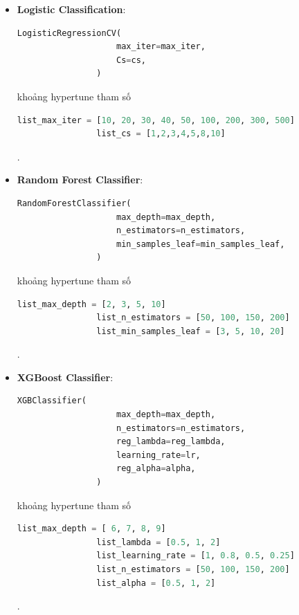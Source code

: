     \begin{itemize}
        \item \textbf{Logistic Classification}: 

            \begin{lstlisting}[language=Python]
                LogisticRegressionCV(
                    max_iter=max_iter,
                    Cs=cs,
                )
            \end{lstlisting}

            khoảng hypertune tham số

            \begin{lstlisting}[language=Python]
                list_max_iter = [10, 20, 30, 40, 50, 100, 200, 300, 500]
                list_cs = [1,2,3,4,5,8,10]
            \end{lstlisting}.

        \item \textbf{Random Forest Classifier}:

            \begin{lstlisting}[language=Python]
                RandomForestClassifier(
                    max_depth=max_depth,
                    n_estimators=n_estimators,
                    min_samples_leaf=min_samples_leaf,
                )
            \end{lstlisting}

            khoảng hypertune tham số

            \begin{lstlisting}[language=Python]
                list_max_depth = [2, 3, 5, 10]
                list_n_estimators = [50, 100, 150, 200]
                list_min_samples_leaf = [3, 5, 10, 20]
            \end{lstlisting}.

        \item \textbf{XGBoost Classifier}:
            \begin{lstlisting}[language=Python]
                XGBClassifier(
                    max_depth=max_depth,
                    n_estimators=n_estimators,
                    reg_lambda=reg_lambda,
                    learning_rate=lr,
                    reg_alpha=alpha,
                )
            \end{lstlisting}

            khoảng hypertune tham số

            \begin{lstlisting}[language=Python]
                list_max_depth = [ 6, 7, 8, 9]
                list_lambda = [0.5, 1, 2]
                list_learning_rate = [1, 0.8, 0.5, 0.25]
                list_n_estimators = [50, 100, 150, 200]
                list_alpha = [0.5, 1, 2]
            \end{lstlisting}.
        
    \end{itemize}

